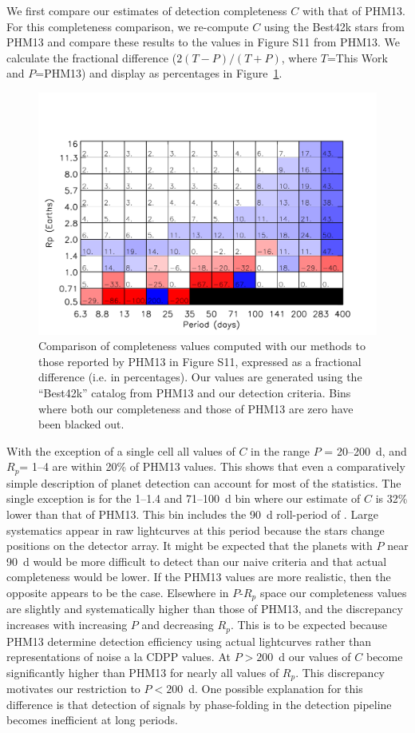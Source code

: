 We first compare our estimates of detection completeness $C$ with that
of PHM13.  For this completeness comparison, we re-compute $C$ using the Best42k
stars from PHM13 and compare these results to the values in Figure S11
from PHM13.  We calculate the fractional difference ($2(T-P)/(T+P)$,
where $T$=This Work and $P$=PHM13) and display as percentages in
Figure~\ref{fig:comp_comp}.  
\begin{figure}[h]
\centerline{\includegraphics[scale=0.55]{chap2/Petigura_Sil_frac_completeness.pdf}}
\caption{Comparison of completeness values computed with our methods
  to those reported by PHM13 in Figure S11, expressed as a fractional
  difference (i.e. in percentages).  Our values are generated using the ``Best42k'' catalog
  from PHM13 and our detection criteria.  Bins where both our
  completeness and those of PHM13 are zero have been blacked out.}
\label{fig:comp_comp}
\end{figure}
With the exception of a single cell all
values of $C$ in the range $P$ = 20--200~d, and $R_p$= 1--4\rearth{}
are within 20\% of PHM13 values.  This shows that even a comparatively
simple description of \kep{} planet detection can account for most of
the statistics.  The single exception is for the 1--1.4\rearth{} and
71--100~d bin where our estimate of $C$ is 32\% lower than that of
PHM13.  This bin includes the 90~d roll-period of \kep{}.  Large
systematics appear in raw \kep{} lightcurves at this period because
the stars change positions on the detector array.  It might be
expected that the planets with $P$ near 90~d would be more
difficult to detect than our naive criteria and that actual
completeness would be lower.  If the PHM13 values are more realistic,
then the opposite appears to be the case.  Elsewhere in $P$-$R_p$
space our completeness values are slightly and systematically higher
than those of PHM13, and the discrepancy increases with increasing $P$
and decreasing $R_p$.  This is to be expected because PHM13 determine
detection efficiency using actual lightcurves rather than
representations of noise a la CDPP values.  At $P>200$~d our values of
$C$ become significantly higher than PHM13 for nearly all values of
$R_p$.  This discrepancy motivates our restriction to $P < 200$~d.
One possible explanation for this difference is that detection of
signals by phase-folding in the \kep{} detection pipeline becomes
inefficient at long periods.


